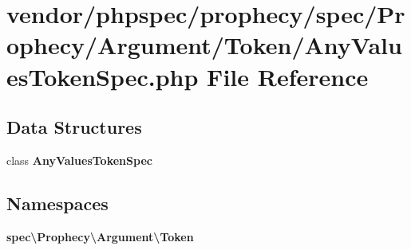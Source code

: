 \section{vendor/phpspec/prophecy/spec/\+Prophecy/\+Argument/\+Token/\+Any\+Values\+Token\+Spec.php File Reference}
\label{_any_values_token_spec_8php}
\subsection*{Data Structures}
\begin{DoxyCompactItemize}
\item 
class {\bf Any\+Values\+Token\+Spec}
\end{DoxyCompactItemize}
\subsection*{Namespaces}
\begin{DoxyCompactItemize}
\item 
 {\bf spec\textbackslash{}\+Prophecy\textbackslash{}\+Argument\textbackslash{}\+Token}
\end{DoxyCompactItemize}
